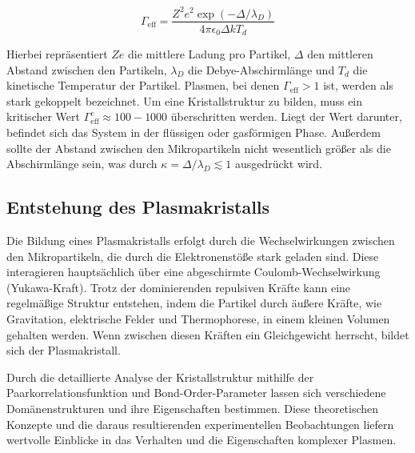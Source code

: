 \documentclass[12pt,a4paper,ngerman]{article}
\begin{document}
\[ \Gamma_{\text{eff}} = \frac{Z^2 e^2 \exp(-\Delta/\lambda_D)}{4 \pi \epsilon_0 \Delta kT_d} \]

Hierbei repräsentiert \(Ze\) die mittlere Ladung pro Partikel, \( \Delta \) den mittleren Abstand zwischen den Partikeln, \( \lambda_D \) die Debye-Abschirmlänge und \( T_d \) die kinetische Temperatur der Partikel. Plasmen, bei denen \( \Gamma_{\text{eff}} > 1 \) ist, werden als stark gekoppelt bezeichnet. Um eine Kristallstruktur zu bilden, muss ein kritischer Wert \( \Gamma_{\text{eff}}^c \approx 100 - 1000 \) überschritten werden. Liegt der Wert darunter, befindet sich das System in der flüssigen oder gasförmigen Phase. Außerdem sollte der Abstand zwischen den Mikropartikeln nicht wesentlich größer als die Abschirmlänge sein, was durch \( \kappa = \Delta/\lambda_D \lesssim 1 \) ausgedrückt wird.




\subsection{Entstehung des Plasmakristalls}
Die Bildung eines Plasmakristalls erfolgt durch die Wechselwirkungen zwischen den Mikropartikeln, die durch die Elektronenstöße stark geladen sind. Diese interagieren hauptsächlich über eine abgeschirmte Coulomb-Wechselwirkung (Yukawa-Kraft). Trotz der dominierenden repulsiven Kräfte kann eine regelmäßige Struktur entstehen, indem die Partikel durch äußere Kräfte, wie Gravitation, elektrische Felder und Thermophorese, in einem kleinen Volumen gehalten werden. Wenn zwischen diesen Kräften ein Gleichgewicht herrscht, bildet sich der Plasmakristall.

Durch die detaillierte Analyse der Kristallstruktur mithilfe der Paarkorrelationsfunktion und Bond-Order-Parameter lassen sich verschiedene Domänenstrukturen und ihre Eigenschaften bestimmen. Diese theoretischen Konzepte und die daraus resultierenden experimentellen Beobachtungen liefern wertvolle Einblicke in das Verhalten und die Eigenschaften komplexer Plasmen.
\end{document}
